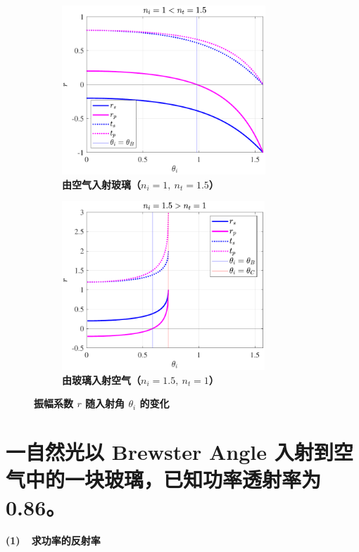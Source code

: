 \documentclass[UTF8]{report}
\theoremstyle{MyLineTheoremStyle} %
\theoremstyle{MyBlockTheoremStyle} %
\theoremstyle{MySubsubsectionStyle} %
\begin{document}
\begin{figure}[H]\centering
\begin{subfigure}[t]{0.49\textwidth}\centering
    \includegraphics[height=180pt]{assets/2/2024-09-15_10-53-31.pdf}
    \caption{\bfseries 由空气入射玻璃（$n_i = 1,\ n_t = 1.5$） }
\end{subfigure}
\begin{subfigure}[t]{0.49\textwidth}\centering
    \includegraphics[height=180pt]{assets/2/2024-09-15_10-53-27.pdf}
    \caption{\bfseries 由玻璃入射空气（$n_i = 1.5,\ n_t = 1$） }
\end{subfigure}
\caption{\bfseries 振幅系数 $r$ 随入射角 $\theta_i$ 的变化 }\label{振幅系数随入射角的变化}
\end{figure}

\vspace{-7mm}
\section{一自然光以 Brewster Angle 入射到空气中的一块玻璃，已知功率透射率为 0.86。}


\textbf{(1)\ \ 求功率的反射率}
\end{document}
